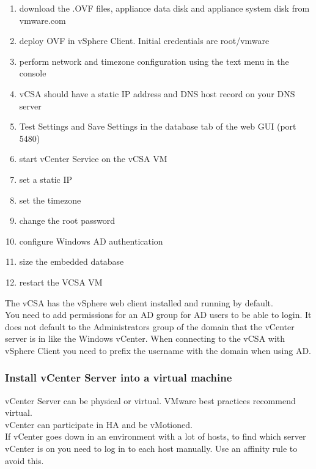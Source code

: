 \begin{enumerate}

\item download the .OVF files, appliance data disk and appliance system disk
from vmware.com
\item deploy OVF in vSphere Client. Initial credentials are root/vmware
\item perform network and timezone configuration using the text menu in the
console
\item vCSA should have a static IP address and DNS host record on your DNS
server
\item Test Settings and Save Settings in the database tab of the web GUI (port
5480)
\item start vCenter Service on the vCSA VM
\item set a static IP
\item set the timezone
\item change the root password
\item configure Windows AD authentication
\item size the embedded database
\item restart the VCSA VM
\end{enumerate}

The vCSA has the vSphere web client installed and running by default.\\

You need to add permissions for an AD group for AD users to be able to login.
It does not default to the Administrators group of the domain that the vCenter
server is in like the Windows vCenter. When connecting to the vCSA with vSphere
Client you need to prefix the username with the domain when using AD.

\subsubsection{Install vCenter Server into a virtual machine}

vCenter Server can be physical or virtual. VMware best practices recommend
virtual.\\

vCenter can participate in HA and be vMotioned.\\

If vCenter goes down in an environment with a lot of hosts, to find which
server vCenter is on you need to log in to each host manually. Use an affinity
rule to avoid this.\\

